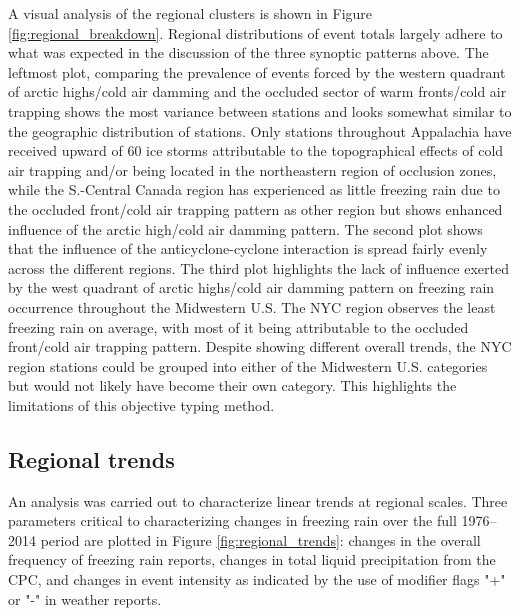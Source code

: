 \documentclass[twocol]{ametsoc}
\begin{document}
A visual analysis of the regional clusters is shown in Figure \ref{fig:regional_breakdown}. Regional distributions of event totals largely adhere to what was expected in the discussion of the three synoptic patterns above. The leftmost plot, comparing the prevalence of events forced by the western quadrant of arctic highs/cold air damming and the occluded sector of warm fronts/cold air trapping shows the most variance between stations and looks somewhat similar to the geographic distribution of stations. Only stations throughout Appalachia have received upward of 60 ice storms attributable to the topographical effects of cold air trapping and/or being located in the northeastern region of occlusion zones, while the S.-Central Canada region has experienced as little freezing rain due to the occluded front/cold air trapping pattern as other region but shows enhanced influence of the arctic high/cold air damming pattern. The second plot shows that the influence of the anticyclone-cyclone interaction is spread fairly evenly across the different regions. The third plot highlights the lack of influence exerted by the west quadrant of arctic highs/cold air damming pattern on freezing rain occurrence throughout the Midwestern U.S. The NYC region observes the least freezing rain on average, with most of it being attributable to the occluded front/cold air trapping pattern. Despite showing different overall trends, the NYC region stations could be grouped into either of the Midwestern U.S. categories but would not likely have become their own category. This highlights the limitations of this objective typing method.

\subsection{Regional trends}
An analysis was carried out to characterize linear trends at regional scales. Three parameters critical to characterizing changes in freezing rain over the full 1976--2014 period are plotted in Figure \ref{fig:regional_trends}: changes in the overall frequency of freezing rain reports, changes in total liquid precipitation from the CPC, and changes in event intensity as indicated by the use of modifier flags "+" or "-" in weather reports.
\end{document}

